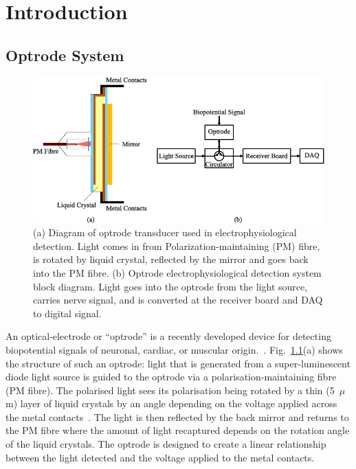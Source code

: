 \chapter{Introduction}


\section{Optrode System}

\begin{figure}[htbp]
\centerline{\includegraphics[width=0.9\linewidth]{OptrodeFigure.pdf}}
\caption{(a) Diagram of optrode transducer used in electrophysiological  detection.  Light comes in from Polarization-maintaining (PM) fibre, is rotated by liquid crystal, reflected by the mirror and goes back into the PM fibre. (b) Optrode electrophysiological  detection system block diagram.  Light goes into the optrode from the light source, carries nerve signal, and is converted at the receiver board and DAQ to digital signal.}
\label{fig_OptrodeFigure}
\end{figure}

An optical-electrode or ``optrode'' is a recently developed device for detecting biopotential signals of neuronal, cardiac, or muscular origin.~\cite{OptrodeTransducer}.  Fig.~\ref{fig_OptrodeFigure}(a) shows the structure of such an optrode: light that is generated from a super-luminescent diode light source is guided to the optrode via a polarisation-maintaining fibre (PM fibre).  The polarised light sees its polarisation being rotated by a thin (5\ $\mu$m) layer of liquid crystals by an angle depending on the voltage applied across the metal contacts~\cite{LCVsensor}.  The light is then reflected by the back mirror and returns to the PM fibre where the amount of light recaptured depends on the rotation angle of the liquid crystals. The optrode is designed to create a linear relationship between the light detected and the voltage applied to the metal contacts.

